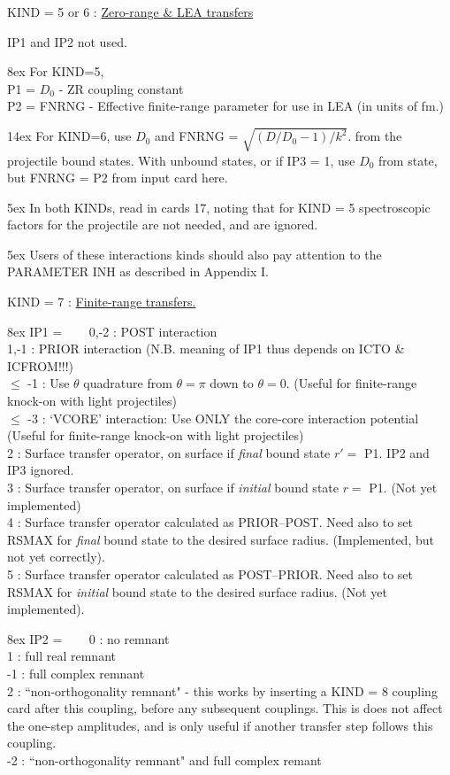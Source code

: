 \documentclass[11pt]{article}
\begin{document}
KIND = 5 or 6 :
\underline{Zero-range \& LEA transfers}

IP1 and IP2 not used.

\hangindent 8ex  For KIND=5,
\\  P1 = $D_0$    - ZR coupling constant
\\  P2 = FNRNG - Effective finite-range parameter for use
in LEA (in units of fm.)



\hangindent 14ex
For KIND=6, use $D_0$ and FNRNG = $\sqrt{(D/D_0 - 1)/k^2}$. from the projectile
bound states.  With unbound states, or if IP3 = 1,
use $D_0$ from state, but FNRNG = P2
from input card here.

\hangindent 5ex
 In both KINDs, read in cards 17, noting that for KIND = 5
spectroscopic factors for the projectile are not needed, and are ignored.

\hangindent 5ex
Users of these interactions kinds should also pay attention to the
PARAMETER INH as described in Appendix I.
\bigskip

KIND = 7 :
\underline{Finite-range transfers.}


\hangindent 8ex  IP1 =
~~~  0,-2 : POST interaction
\\  1,-1 : PRIOR interaction
 (N.B. meaning of IP1 thus depends on ICTO \& ICFROM!!!)
\\  $\le$ -1 : Use $\theta$ quadrature from $\theta = \pi$ down to $\theta = 0$.
 (Useful for finite-range knock-on with light projectiles)
\\  $\le$ -3 : `VCORE' interaction:
Use ONLY the core-core interaction potential
 (Useful for finite-range knock-on with light projectiles)
\\ 2 : Surface transfer operator, on surface if {\em final} bound state $r' =$ P1. IP2 and IP3 ignored.
\\ 3 : Surface transfer operator, on surface if {\em initial} bound state $r =$ P1. (Not yet implemented)
\\ 4 : Surface transfer operator calculated as PRIOR--POST. Need also to set RSMAX for {\em final} bound state to the desired surface radius. 
   (Implemented, but not yet correctly).
\\ 5 : Surface transfer operator calculated as POST--PRIOR. Need also to set RSMAX for {\em initial} bound state to the desired surface radius. 
   (Not yet implemented).


\hangindent 8ex  IP2 =
~~~  0 : no remnant
\\  1 : full real remnant
\\  -1 : full complex remnant
\\  2 : ``non-orthogonality remnant" - this works by inserting
a KIND = 8 coupling card after this coupling, before any subsequent
couplings.
This is does not affect the one-step amplitudes, and is only useful
if another transfer step follows this coupling.
\\  -2 : ``non-orthogonality remnant" and full complex remant
\end{document}
